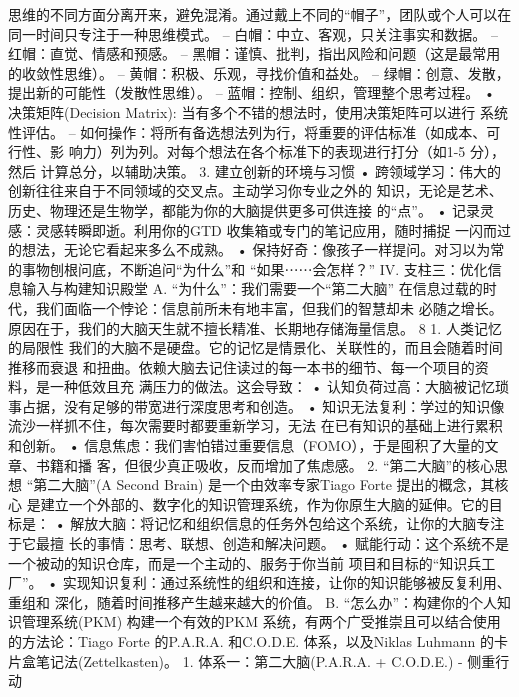 \documentclass[a4paper,12pt]{article}
\begin{document}
\begin{multicols}{2}
    思维的不同方面分离开来，避免混淆。通过戴上不同的``帽子''，团队或个人可以在
    同一时间只专注于一种思维模式。 --
    白帽：中立、客观，只关注事实和数据。 -- 红帽：直觉、情感和预感。 --
    黑帽：谨慎、批判，指出风险和问题（这是最常用的收敛性思维）。 --
    黄帽：积极、乐观，寻找价值和益处。 --
    绿帽：创意、发散，提出新的可能性（发散性思维）。 --
    蓝帽：控制、组织，管理整个思考过程。 • 决策矩阵(Decision Matrix):
    当有多个不错的想法时，使用决策矩阵可以进行 系统性评估。 --
    如何操作：将所有备选想法列为行，将重要的评估标准（如成本、可行性、影
    响力）列为列。对每个想法在各个标准下的表现进行打分（如1-5 分），然后
    计算总分，以辅助决策。 3. 建立创新的环境与习惯 •
    跨领域学习：伟大的创新往往来自于不同领域的交叉点。主动学习你专业之外的
    知识，无论是艺术、历史、物理还是生物学，都能为你的大脑提供更多可供连接
    的``点''。 • 记录灵感：灵感转瞬即逝。利用你的GTD
    收集箱或专门的笔记应用，随时捕捉
    一闪而过的想法，无论它看起来多么不成熟。 •
    保持好奇：像孩子一样提问。对习以为常的事物刨根问底，不断追问``为什么''和
    ``如果⋯⋯会怎样？'' IV. 支柱三：优化信息输入与构建知识殿堂 A.
    ``为什么''：我们需要一个``第二大脑''
    在信息过载的时代，我们面临一个悖论：信息前所未有地丰富，但我们的智慧却未
    必随之增长。原因在于，我们的大脑天生就不擅长精准、长期地存储海量信息。
    8 1. 人类记忆的局限性
    我们的大脑不是硬盘。它的记忆是情景化、关联性的，而且会随着时间推移而衰退
    和扭曲。依赖大脑去记住读过的每一本书的细节、每一个项目的资料，是一种低效且充
    满压力的做法。这会导致： •
    认知负荷过高：大脑被记忆琐事占据，没有足够的带宽进行深度思考和创造。
    •
    知识无法复利：学过的知识像流沙一样抓不住，每次需要时都要重新学习，无法
    在已有知识的基础上进行累积和创新。 •
    信息焦虑：我们害怕错过重要信息（FOMO），于是囤积了大量的文章、书籍和播
    客，但很少真正吸收，反而增加了焦虑感。 2. ``第二大脑''的核心思想
    ``第二大脑''(A Second Brain) 是一个由效率专家Tiago Forte
    提出的概念，其核心
    是建立一个外部的、数字化的知识管理系统，作为你原生大脑的延伸。它的目标是：
    •
    解放大脑：将记忆和组织信息的任务外包给这个系统，让你的大脑专注于它最擅
    长的事情：思考、联想、创造和解决问题。 •
    赋能行动：这个系统不是一个被动的知识仓库，而是一个主动的、服务于你当前
    项目和目标的``知识兵工厂''。 •
    实现知识复利：通过系统性的组织和连接，让你的知识能够被反复利用、重组和
    深化，随着时间推移产生越来越大的价值。 B.
    ``怎么办''：构建你的个人知识管理系统(PKM) 构建一个有效的PKM
    系统，有两个广受推崇且可以结合使用的方法论：Tiago Forte 的P.A.R.A.
    和C.O.D.E. 体系，以及Niklas Luhmann 的卡片盒笔记法(Zettelkasten)。
    1. 体系一：第二大脑(P.A.R.A. + C.O.D.E.) - 侧重行动

\end{multicols}
\end{document}
